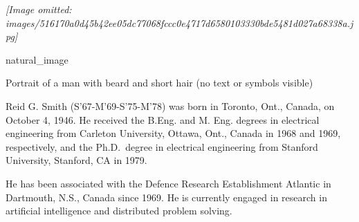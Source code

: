 \documentclass[
]{article}
\begin{document}
\textit{[Image omitted: images/516170a0d45b42ee05dc77068fccc0e4717d6580103330bde5481d027a68338a.jpg]}

natural\_image

Portrait of a man with beard and short hair (no text or symbols visible)

Reid G. Smith (S'67-M'69-S'75-M'78) was born in Toronto, Ont., Canada,
on October 4, 1946. He received the B.Eng. and M. Eng. degrees in
electrical engineering from Carleton University, Ottawa, Ont., Canada in
1968 and 1969, respectively, and the Ph.D.~degree in electrical
engineering from Stanford University, Stanford, CA in 1979.

He has been associated with the Defence Research Establishment Atlantic
in Dartmouth, N.S., Canada since 1969. He is currently engaged in
research in artificial intelligence and distributed problem solving.
\end{document}
